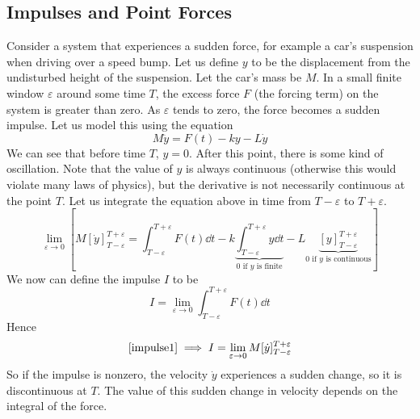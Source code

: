 \subsection{Impulses and Point Forces}
Consider a system that experiences a sudden force, for example a car's suspension when driving over a speed bump.
Let us define \(y\) to be the displacement from the undisturbed height of the suspension.
Let the car's mass be \(M\).
In a small finite window \(\varepsilon\) around some time \(T\), the excess force \(F\) (the forcing term) on the system is greater than zero.
As \(\varepsilon\) tends to zero, the force becomes a sudden impulse.
Let us model this using the equation
\[
	M\ddot y = F(t) - ky - L\dot y
\]
We can see that before time \(T\), \(y=0\).
After this point, there is some kind of oscillation.
Note that the value of \(y\) is always continuous (otherwise this would violate many laws of physics), but the derivative is not necessarily continuous at the point \(T\).
Let us integrate the equation above in time from \(T - \varepsilon\) to \(T + \varepsilon\).
\begin{equation}\label{impulse1}
	\lim_{\varepsilon \to 0} \left[ M[\dot y]_{T - \varepsilon}^{T + \varepsilon} = \int_{T - \varepsilon}^{T + \varepsilon} F(t) \dd{t} - k \underbrace{\int_{T - \varepsilon}^{T + \varepsilon} y \dd{t}}_{0\text{ if \(y\) is finite}} - L\underbrace{[y]_{T - \varepsilon}^{T + \varepsilon}}_{0\text{ if \(y\) is continuous}} \right]
\end{equation}
We now can define the impulse \(I\) to be
\[
	I = \lim_{\varepsilon \to 0} \int_{T - \varepsilon}^{T + \varepsilon} F(t) \dd{t}
\]
Hence
\[
	\eqref{impulse1} \implies I = \lim_{\varepsilon \to 0} M[\dot y]_{T - \varepsilon}^{T + \varepsilon}
\]
So if the impulse is nonzero, the velocity \(\dot y\) experiences a sudden change, so it is discontinuous at \(T\).
The value of this sudden change in velocity depends on the integral of the force.
